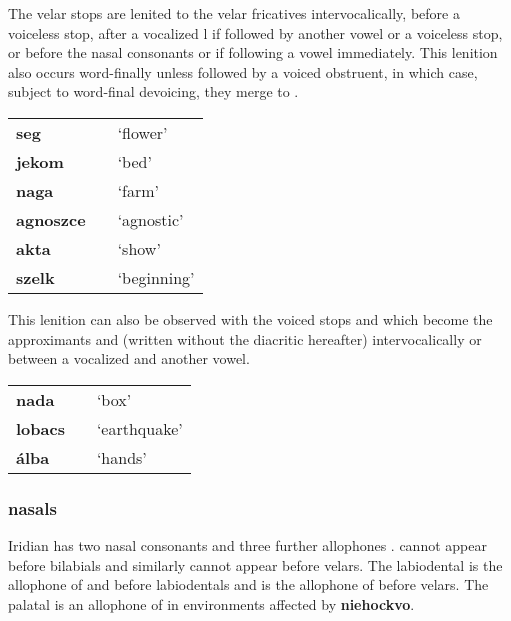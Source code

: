 \par The velar stops  are lenited to the velar fricatives  intervocalically, before a voiceless stop, after a vocalized l if followed by another vowel or a voiceless stop, or before the nasal consonants  or  if following a vowel immediately. This lenition also occurs word-finally unless followed by a voiced obstruent, in which case, subject to word-final devoicing, they merge to \textipa{[x]}.
\begin{center}
	\centering \small
	\begin{tabularx}{0.8\textwidth}{>{\bfseries}YYY}
		seg			&&`flower'\\
		jekom		&&`bed'\\
		naga		&&`farm'\\
		agnoszce	& &`agnostic'\\
		akta		&&`show'\\
		szelk		&&`beginning'\\
	\end{tabularx}
\end{center}

\par This lenition can also be observed with the voiced stops  and  which become the approximants  and  (written without the diacritic hereafter) intervocalically or between a vocalized  and another vowel.
\begin{center}
	\centering \small
	\begin{tabularx}{0.8\textwidth}{>{\bfseries}YYY}
		nada &  & `box'\\
		lobacs&&`earthquake'\\
		álba && `hands'\\
	\end{tabularx}
\end{center}


\subsubsection{nasals}
Iridian has two nasal consonants  and three further allophones .  cannot appear before bilabials and similarly  cannot appear before velars. The labiodental  is the allophone of  and  before labiodentals and  is the allophone of  before velars. The palatal \bt{\nn} is an allophone of  in environments affected by \textbf{niehockvo}.

